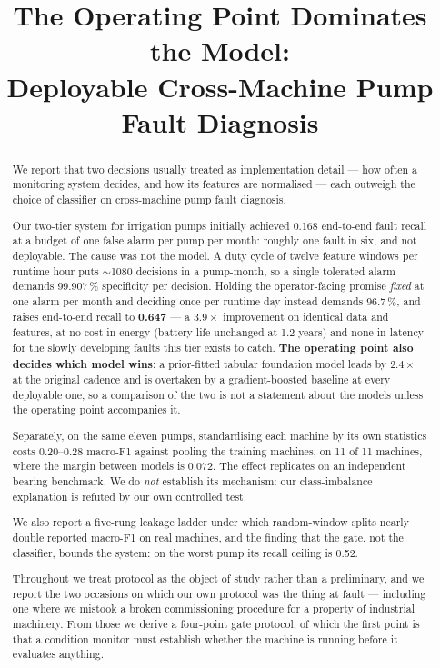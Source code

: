 \documentclass[conference,a4paper,10pt]{IEEEtran}
\begin{document}
\title{The Operating Point Dominates the Model:\\
Deployable Cross-Machine Pump Fault Diagnosis}

\author{
}

\maketitle

\begin{abstract}
We report that two decisions usually treated as implementation detail --- how often
a monitoring system decides, and how its features are normalised --- each outweigh
the choice of classifier on cross-machine pump fault diagnosis.

Our two-tier system for irrigation pumps initially achieved 0.168 end-to-end fault
recall at a budget of one false alarm per pump per month: roughly one fault in
six, and not deployable. The cause was not the model. A duty cycle of twelve
feature windows per runtime hour puts $\sim$1080 decisions in a pump-month, so a
single tolerated alarm demands 99.907\,\% specificity per decision. Holding the
operator-facing promise \emph{fixed} at one alarm per month and deciding once per
runtime day instead demands 96.7\,\%, and raises end-to-end recall to
\textbf{0.647} --- a $3.9\times$ improvement on identical data and features, at no
cost in energy (battery life unchanged at 1.2 years) and none in latency for the
slowly developing faults this tier exists to catch. \textbf{The operating point
also decides which model wins}: a prior-fitted tabular foundation model leads by
$2.4\times$ at the original cadence and is overtaken by a gradient-boosted baseline
at every deployable one, so a comparison of the two is not a statement about the
models unless the operating point accompanies it.

Separately, on the same eleven pumps, standardising each machine by its own
statistics costs 0.20--0.28 macro-F1 against pooling the training machines, on 11
of 11 machines, where the margin between models is 0.072. The effect replicates on
an independent bearing benchmark. We do \emph{not} establish its mechanism: our
class-imbalance explanation is refuted by our own controlled test.

We also report a five-rung leakage ladder under which random-window splits nearly
double reported macro-F1 on real machines, and the finding that the gate, not the
classifier, bounds the system: on the worst pump its recall ceiling is 0.52.

Throughout we treat protocol as the object of study rather than a preliminary, and
we report the two occasions on which our own protocol was the thing at fault ---
including one where we mistook a broken commissioning procedure for a property of
industrial machinery. From those we derive a four-point gate protocol, of which the
first point is that a condition monitor must establish whether the machine is
running before it evaluates anything.
\end{abstract}
\end{document}
